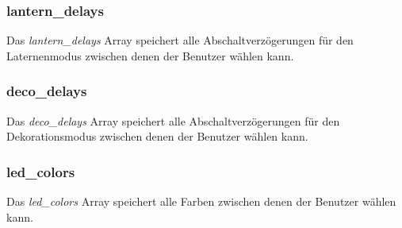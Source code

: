     \subsubsection{lantern\_delays}
        Das \textit{lantern\_delays} Array speichert alle Abschaltverzögerungen für
        den Laternenmodus zwischen denen der Benutzer wählen kann.
        

    \subsubsection{deco\_delays}
        Das \textit{deco\_delays} Array speichert alle Abschaltverzögerungen für
        den Dekorationsmodus zwischen denen der Benutzer wählen kann.
        

    \subsubsection{led\_colors}
        Das \textit{led\_colors} Array speichert alle Farben zwischen denen der
        Benutzer wählen kann.
        
